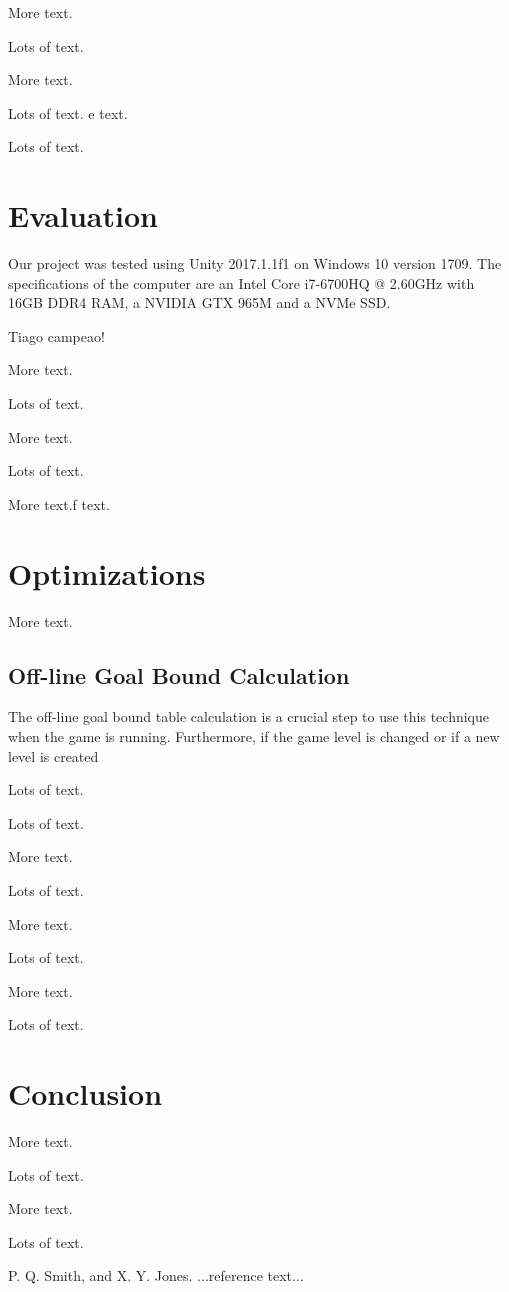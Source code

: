 \documentclass{sigplanconf}[10pt]
\begin{document}
More text.

Lots of text.

More text.

Lots of text.
e text.

Lots of text.
\section{Evaluation}
\label{eval}

Our project was tested using Unity 2017.1.1f1 on Windows 10 version 1709. The specifications of the computer are an Intel Core i7-6700HQ @ 2.60GHz with 16GB DDR4 RAM, a NVIDIA GTX 965M and a NVMe SSD.

Tiago campeao!

More text.

Lots of text.

More text.

Lots of text.

More text.f text.


\section{Optimizations}
\label{optimi}
More text.
\subsection{Off-line Goal Bound Calculation}
The off-line goal bound table calculation is a crucial step to use this technique when the game is running. Furthermore, if the game level is changed or if a new level is created


Lots of text.

Lots of text.

More text.

Lots of text.

More text.

Lots of text.

More text.

Lots of text.
\section{Conclusion}
\label{conclusion}
More text.

Lots of text.

More text.

Lots of text.






\begin{thebibliography}{}
\softraggedright

P. Q. Smith, and X. Y. Jones. ...reference text...

\end{thebibliography}
\end{document}

